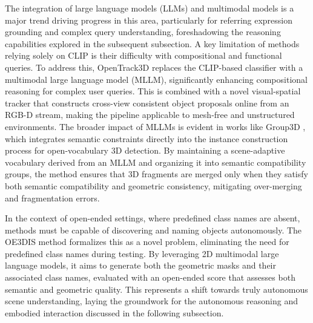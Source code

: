 \documentclass[11pt]{article}
\begin{document}
The integration of large language models (LLMs) and multimodal models is a major trend driving progress in this area, particularly for referring expression grounding and complex query understanding, foreshadowing the reasoning capabilities explored in the subsequent subsection. A key limitation of methods relying solely on CLIP is their difficulty with compositional and functional queries. To address this, OpenTrack3D \cite{ref517} replaces the CLIP-based classifier with a multimodal large language model (MLLM), significantly enhancing compositional reasoning for complex user queries. This is combined with a novel visual-spatial tracker that constructs cross-view consistent object proposals online from an RGB-D stream, making the pipeline applicable to mesh-free and unstructured environments. The broader impact of MLLMs is evident in works like Group3D \cite{ref518}, which integrates semantic constraints directly into the instance construction process for open-vocabulary 3D detection. By maintaining a scene-adaptive vocabulary derived from an MLLM and organizing it into semantic compatibility groups, the method ensures that 3D fragments are merged only when they satisfy both semantic compatibility and geometric consistency, mitigating over-merging and fragmentation errors.

In the context of open-ended settings, where predefined class names are absent, methods must be capable of discovering and naming objects autonomously. The OE3DIS method \cite{ref519} formalizes this as a novel problem, eliminating the need for predefined class names during testing. By leveraging 2D multimodal large language models, it aims to generate both the geometric masks and their associated class names, evaluated with an open-ended score that assesses both semantic and geometric quality. This represents a shift towards truly autonomous scene understanding, laying the groundwork for the autonomous reasoning and embodied interaction discussed in the following subsection.
\end{document}
